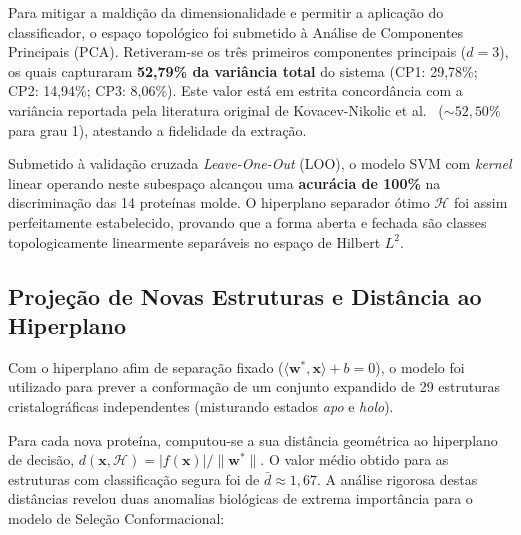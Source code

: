 \documentclass[12pt, a4paper]{article}
\begin{document}
Para mitigar a maldição da dimensionalidade e permitir a aplicação do classificador, o espaço topológico foi submetido à Análise de Componentes Principais (PCA). Retiveram-se os três primeiros componentes principais ($d=3$), os quais capturaram \textbf{52,79\% da variância total} do sistema (CP1: 29,78\%; CP2: 14,94\%; CP3: 8,06\%). Este valor está em estrita concordância com a variância reportada pela literatura original de Kovacev-Nikolic et al.~\cite{kovacev2016} ($\sim 52,50\%$ para grau 1), atestando a fidelidade da extração.

Submetido à validação cruzada \textit{Leave-One-Out} (LOO), o modelo SVM com \textit{kernel} linear operando neste subespaço alcançou uma \textbf{acurácia de 100\%} na discriminação das 14 proteínas molde. O hiperplano separador ótimo $\mathcal{H}$ foi assim perfeitamente estabelecido, provando que a forma aberta e fechada são classes topologicamente linearmente separáveis no espaço de Hilbert $L^2$.

\subsection{Projeção de Novas Estruturas e Distância ao Hiperplano}
\label{subsec:res_novas}

Com o hiperplano afim de separação fixado ($\langle\mathbf{w}^*,\mathbf{x}\rangle + b = 0$), o modelo foi utilizado para prever a conformação de um conjunto expandido de 29 estruturas cristalográficas independentes (misturando estados \textit{apo} e \textit{holo}).

Para cada nova proteína, computou-se a sua distância geométrica ao hiperplano de decisão, $d(\mathbf{x}, \mathcal{H}) = |f(\mathbf{x})| / \|\mathbf{w}^*\|$. O valor médio obtido para as estruturas com classificação segura foi de $\bar{d} \approx 1,67$. A análise rigorosa destas distâncias revelou duas anomalias biológicas de extrema importância para o modelo de Seleção Conformacional:
\end{document}
